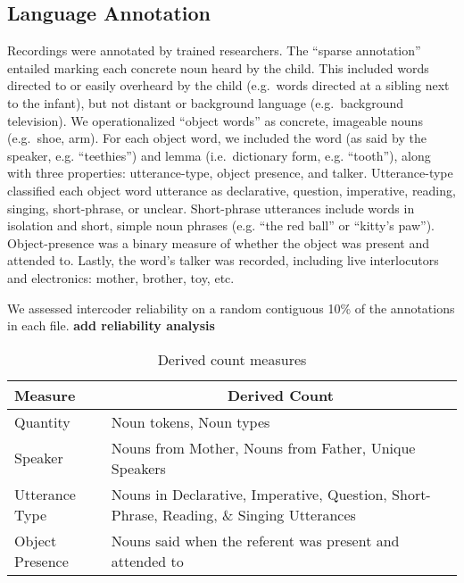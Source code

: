 \documentclass[floatsintext,man]{apa6}
\theoremstyle{definition}
\theoremstyle{definition}
\theoremstyle{definition}
\theoremstyle{remark}
\begin{document}
\subsection{Language Annotation}\label{language-annotation}

Recordings were annotated by trained researchers. The \enquote{sparse
annotation} entailed marking each concrete noun heard by the child. This
included words directed to or easily overheard by the child (e.g.~words
directed at a sibling next to the infant), but not distant or background
language (e.g.~background television). We operationalized
\enquote{object words} as concrete, imageable nouns (e.g.~shoe, arm).
For each object word, we included the word (as said by the speaker, e.g.
\enquote{teethies}) and lemma (i.e.~dictionary form, e.g.
\enquote{tooth}), along with three properties: utterance-type, object
presence, and talker. Utterance-type classified each object word
utterance as declarative, question, imperative, reading, singing,
short-phrase, or unclear. Short-phrase utterances include words in
isolation and short, simple noun phrases (e.g. \enquote{the red ball} or
\enquote{kitty's paw}). Object-presence was a binary measure of whether
the object was present and attended to. Lastly, the word's talker was
recorded, including live interlocutors and electronics: mother, brother,
toy, etc.

We assessed intercoder reliability on a random contiguous 10\% of the
annotations in each file. \textbf{add reliability analysis}

\begin{table}[tbp]
\begin{center}
\begin{threeparttable}
\caption{\label{tab:measures-tab}Derived count measures}
\small{
\begin{tabular}{ll}
\toprule
Measure & \multicolumn{1}{c}{Derived Count}\\
\midrule
Quantity & Noun tokens, Noun types\\
Speaker & Nouns from Mother, Nouns from Father, Unique Speakers\\
Utterance Type & Nouns in Declarative, Imperative, Question, Short-Phrase, Reading, \& Singing Utterances\\
Object Presence & Nouns said when the referent was present and attended to\\
\bottomrule
\end{tabular}
}
\end{threeparttable}
\end{center}
\end{table}
\end{document}
